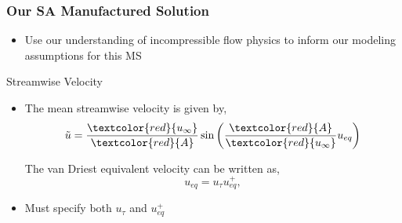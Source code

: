 \documentclass[mathserif]{beamer}
\begin{document}
 \begin{frame}
   \frametitle{Our SA Manufactured Solution}

  \begin{block}{}
   \begin{itemize}

    \item Use our understanding of incompressible flow
	  physics to inform our modeling assumptions for this MS

   \end{itemize}
  \end{block}

  \begin{block}{Streamwise Velocity}
   \begin{itemize}
  
    \item The mean streamwise velocity is given by,
	  \begin{equation*}\label{eq:u_01}
	   \tilde{u} = \frac{\textcolor{red}{u_{\infty}}}{\textcolor{red}{A}} \sin \left( \frac{\textcolor{red}{A}}{\textcolor{red}{u_{\infty}}} u_{eq} \right)
	  \end{equation*}
	  
	  The van Driest equivalent velocity can be written as,
	  \begin{equation*}\label{eq:u_02}
	   u_{eq} = u_{\tau} u_{eq}^+ ,
	  \end{equation*}
	  
    \item Must specify both $u_{\tau}$ and $u^+_{eq}$
	  
   \end{itemize}
  \end{block}

 \end{frame}
\end{document}
